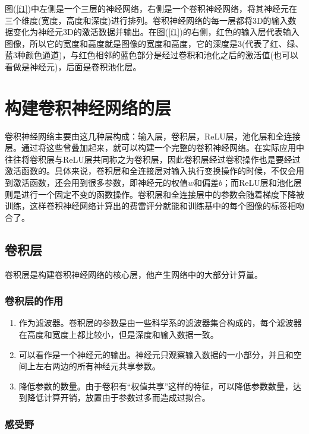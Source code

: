 \documentclass[UTF-8, a4paper, 12pt]{ctexart}
\begin{document}
图(\ref{f1})中左侧是一个三层的神经网络，右侧是一个卷积神经网络，将其神经元在三个维度(宽度，高度和深度)进行排列。卷积神经网络的每一层都将3D的输入数据变化为神经元3D的激活数据并输出。在图(\ref{f1})的右侧，红色的输入层代表输入图像，所以它的宽度和高度就是图像的宽度和高度，它的深度是3(代表了红、绿、蓝3种颜色通道)，与红色相邻的蓝色部分是经过卷积和池化之后的激活值(也可以看做是神经元)，后面是卷积池化层。



\section{构建卷积神经网络的层}

卷积神经网络主要由这几种层构成：输入层，卷积层，ReLU层，池化层和全连接层。通过将这些曾叠加起来，就可以构建一个完整的卷积神经网络。在实际应用中往往将卷积层与ReLU层共同称之为卷积层，因此卷积层经过卷积操作也是要经过激活函数的。具体来说，卷积层和全连接层对输入执行变换操作的时候，不仅会用到激活函数，还会用到很多参数，即神经元的权值$w$和偏差$b$；而ReLU层和池化层则是进行一个固定不变的函数操作。卷积层和全连接层中的参数会随着梯度下降被训练，这样卷积神经网络计算出的费雷评分就能和训练基中的每个图像的标签相吻合了。

\subsection{卷积层}
卷积层是构建卷积神经网络的核心层，他产生网络中的大部分计算量。
\subsubsection{卷积层的作用}

\begin{enumerate}
    \item 作为滤波器。卷积层的参数是由一些科学系的滤波器集合构成的，每个滤波器在高度和宽度上都比较小，但是深度和输入数据一致。
    \item 可以看作是一个神经元的输出。神经元只观察输入数据的一小部分，并且和空间上左右两边的所有神经元共享参数。
    \item 降低参数的数量。由于卷积有“权值共享”这样的特征，可以降低参数数量，达到降低计算开销，放置由于参数过多而造成过拟合。
\end{enumerate}

\subsubsection{感受野}
\end{document}
